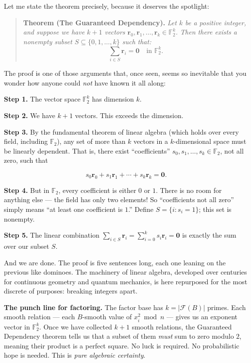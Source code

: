 Let me state the theorem precisely, because it deserves the spotlight:

\begin{quote}
\textbf{Theorem (The Guaranteed Dependency).} \emph{Let \(k\) be a positive integer, and suppose we have \(k + 1\) vectors \(\mathbf{r}_0, \mathbf{r}_1, \ldots, \mathbf{r}_k \in \mathbb{F}_2^k\). Then there exists a nonempty subset \(S \subseteq \{0, 1, \ldots, k\}\) such that:} \[\sum_{i \in S} \mathbf{r}_i = \mathbf{0} \quad \text{in } \mathbb{F}_2^k.\]
\end{quote}

The proof is one of those arguments that, once seen, seems so inevitable that you wonder how anyone could \emph{not} have known it all along:

\textbf{Step 1.} The vector space \(\mathbb{F}_2^k\) has dimension \(k\).

\textbf{Step 2.} We have \(k + 1\) vectors. This exceeds the dimension.

\textbf{Step 3.} By the fundamental theorem of linear algebra (which holds over every field, including \(\mathbb{F}_2\)), any set of more than \(k\) vectors in a \(k\)-dimensional space must be linearly dependent. That is, there exist ``coefficients'' \(s_0, s_1, \ldots, s_k \in \mathbb{F}_2\), not all zero, such that

\[s_0 \mathbf{r}_0 + s_1 \mathbf{r}_1 + \cdots + s_k \mathbf{r}_k = \mathbf{0}.\]

\textbf{Step 4.} But in \(\mathbb{F}_2\), every coefficient is either \(0\) or \(1\). There is no room for anything else --- the field has only two elements! So ``coefficients not all zero'' simply means ``at least one coefficient is \(1\).'' Define \(S = \{i : s_i = 1\}\); this set is nonempty.

\textbf{Step 5.} The linear combination \(\sum_{i \in S} \mathbf{r}_i = \sum_{i=0}^k s_i \mathbf{r}_i = \mathbf{0}\) is exactly the sum over our subset \(S\).

And we are done. The proof is five sentences long, each one leaning on the previous like dominoes. The machinery of linear algebra, developed over centuries for continuous geometry and quantum mechanics, is here repurposed for the most discrete of purposes: breaking integers apart.

\textbf{The punch line for factoring.} The factor base has \(k = |\mathcal{F}(B)|\) primes. Each smooth relation --- each \(B\)-smooth value of \(x_i^2 \bmod n\) --- gives us an exponent vector in \(\mathbb{F}_2^k\). Once we have collected \(k + 1\) smooth relations, the Guaranteed Dependency theorem tells us that a subset of them \emph{must} sum to zero modulo \(2\), meaning their product is a perfect square. No luck is required. No probabilistic hope is needed. This is \emph{pure algebraic certainty}.

